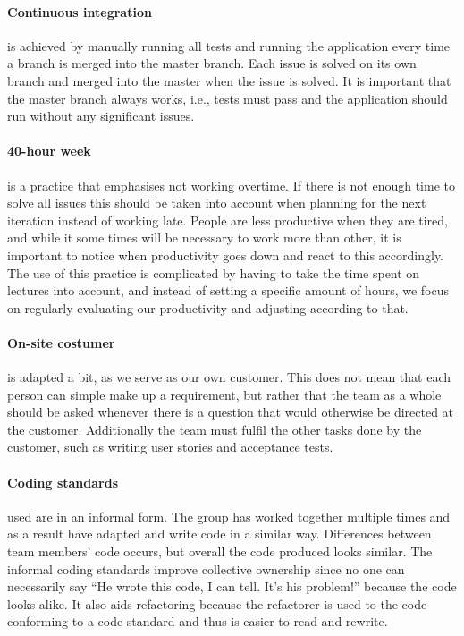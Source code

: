 \paragraph{Continuous integration} is achieved by manually running all tests and running the application every time a branch is merged into the master branch. Each issue is solved on its own branch and merged into the master when the issue is solved. It is important that the master branch always works, i.e., tests must pass and the application should run without any significant issues.

\paragraph{40-hour week} is a practice that emphasises not working overtime. If there is not enough time to solve all issues this should be taken into account when planning for the next iteration instead of working late. People are less productive when they are tired, and while it some times will be necessary to work more than other, it is important to notice when productivity goes down and react to this accordingly. The use of this practice is complicated by having to take the time spent on lectures into account, and instead of setting a specific amount of hours, we focus on regularly evaluating our productivity and adjusting according to that.
 
\paragraph{On-site costumer} is adapted a bit, as we serve as our own customer. This does not mean that each person can simple make up a requirement, but rather that the team as a whole should be asked whenever there is a question that would otherwise be directed at the customer. Additionally the team must fulfil the other tasks done by the customer, such as writing user stories and acceptance tests.

\paragraph{Coding standards} used are in an informal form. The group has worked together multiple times and as a result have adapted and write code in a similar way. Differences between team members' code occurs, but overall the code produced looks similar. The informal coding standards improve collective ownership since no one can necessarily say ``He wrote this code, I can tell. It's his problem!'' because the code looks alike. It also aids refactoring because the refactorer is used to the code conforming to a code standard and thus is easier to read and rewrite.
